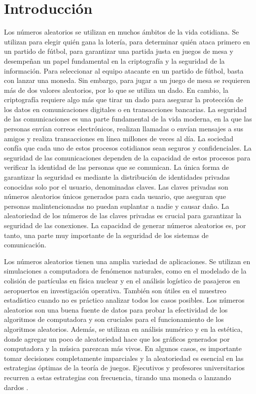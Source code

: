 \chapter{Introducción}

    Los números aleatorios se utilizan en muchos ámbitos de la vida cotidiana. Se utilizan para elegir quién gana la lotería, para determinar quién ataca primero en un partido de fútbol, para garantizar una partida justa en juegos de mesa y desempeñan un papel fundamental en la criptografía y la seguridad de la información. Para seleccionar al equipo atacante en un partido de fútbol, basta con lanzar una moneda. Sin embargo, para jugar a un juego de mesa se requieren más de dos valores aleatorios, por lo que se utiliza un dado. En cambio, la criptografía requiere algo más que tirar un dado para asegurar la protección de los datos en comunicaciones digitales o en transacciones bancarias. La seguridad de las comunicaciones es una parte fundamental de la vida moderna, en la que las personas envían correos electrónicos, realizan llamadas o envían mensajes a sus amigos y realiza transacciones en línea millones de veces al día. La sociedad confía que cada uno de estos procesos cotidianos sean seguros y confidenciales. La seguridad de las comunicaciones dependen de la capacidad de estos procesos para verificar la identidad de las personas que se comunican. La única forma de garantizar la seguridad es mediante la distribución de identidades privadas conocidas solo por el usuario, denominadas claves. Las claves privadas son números aleatorios únicos generados para cada usuario, que aseguran que personas malintencionadas no puedan suplantar a nadie y causar daño. La aleatoriedad de los números de las claves privadas es crucial para garantizar la seguridad de las conexiones. La capacidad de generar números aleatorios es, por tanto, una parte muy importante de la seguridad de los sistemas de comunicación.

    Los números aleatorios tienen una amplia variedad de aplicaciones. Se utilizan en simulaciones a computadora de fenómenos naturales, como en el modelado de la colisión de partículas en física nuclear y en el análisis logístico de pasajeros en aeropuertos en investigación operativa. También son útiles en el muestreo estadístico cuando no es práctico analizar todos los casos posibles. Los números aleatorios son una buena fuente de datos para probar la efectividad de los algoritmos de computadora y son cruciales para el funcionamiento de los algoritmos aleatorios. Además, se utilizan en análisis numérico y en la estética, donde agregar un poco de aleatoriedad hace que los gráficos generados por computadora y la música parezcan más vivos. En algunos casos, es importante tomar decisiones completamente imparciales y la aleatoriedad es esencial en las estrategias óptimas de la teoría de juegos. Ejecutivos y profesores universitarios recurren a estas estrategias con frecuencia, tirando una moneda o lanzando dardos \cite{Knuth2014}. 

